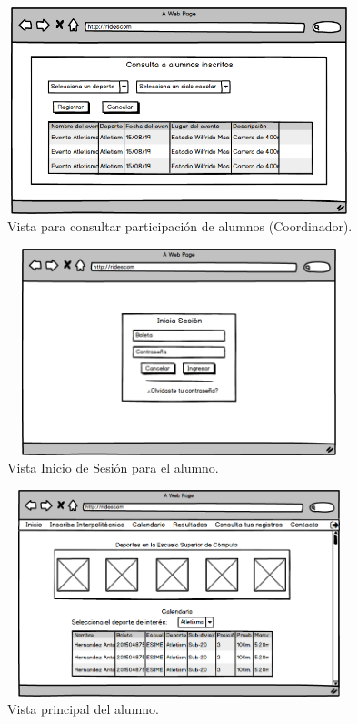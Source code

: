 		\begin{figure} [hbt!]
			\centering
			\includegraphics[width=10cm, height=6cm]{Imagenes/Nuevos/P16_Consulta_para_expedir_constancias}
			\caption{Vista para consultar participación de alumnos (Coordinador).}
			\label{consultaparaexpedirconstancias}
		\end{figure}
		
		\begin{figure} [hbt!]
			\centering
			\includegraphics[width=10cm, height=6cm]{Imagenes/Nuevos/P17_Login_alumno}
			\caption{Vista Inicio de Sesión para el alumno.}
			\label{loginalumno}
		\end{figure}
	\pagebreak
		
		\begin{figure} [hbt!]
			\centering
			\includegraphics[width=10cm, height=6cm]{Imagenes/Nuevos/P18_Inicio_paticipante}
			\caption{Vista principal del alumno.}
			\label{principalalum}
		\end{figure}
		
